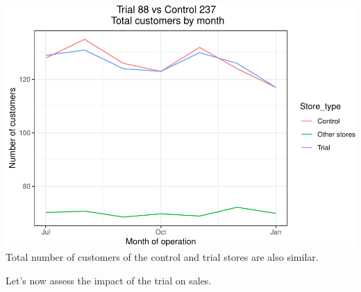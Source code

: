 \documentclass[]{article}
\begin{document}
\includegraphics{Task2_files/figure-latex/unnamed-chunk-15-1.pdf} Total
number of customers of the control and trial stores are also similar.

Let's now assess the impact of the trial on sales.
\end{document}
